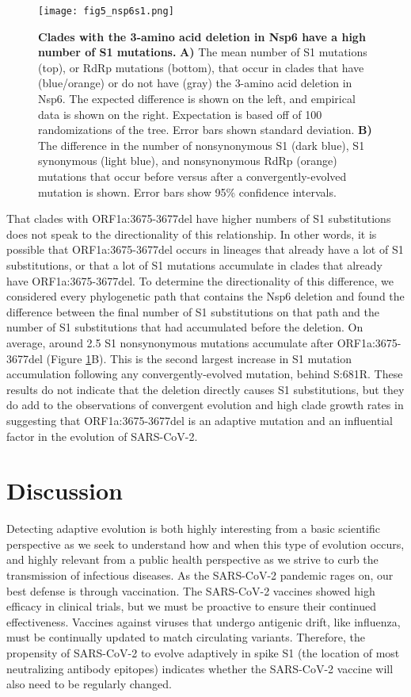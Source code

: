 \documentclass[11pt,oneside,letterpaper]{article}
\begin{document}
\begin{figure}[h!]
	\centerline{\texttt{[image: fig5\_nsp6s1.png]}}
	\caption{\textbf{Clades with the 3-amino acid deletion in Nsp6 have a high number of S1 mutations.}
	\textbf{A)} The mean number of S1 mutations (top), or RdRp mutations (bottom), that occur in clades that have (blue/orange) or do not have (gray) the 3-amino acid deletion in Nsp6.
	The expected difference is shown on the left, and empirical data is shown on the right.
	Expectation is based off of 100 randomizations of the tree. Error bars shown standard deviation.
	\textbf{B)} The difference in the number of nonsynonymous S1 (dark blue), S1 synonymous (light blue), and nonsynonymous RdRp (orange) mutations that occur before versus after a convergently-evolved mutation is shown.
	Error bars show 95\% confidence intervals.
	}
	\label{fig:nsp6s1}
\end{figure}

That clades with ORF1a:3675-3677del have higher numbers of S1 substitutions does not speak to the directionality of this relationship.
In other words, it is possible that ORF1a:3675-3677del occurs in lineages that already have a lot of S1 substitutions, or that a lot of S1 mutations accumulate in clades that already have ORF1a:3675-3677del.
To determine the directionality of this difference, we considered every phylogenetic path that contains the Nsp6 deletion and found the difference between the final number of S1 substitutions on that path and the number of S1 substitutions that had accumulated before the deletion.
On average, around 2.5 S1 nonsynonymous mutations accumulate after ORF1a:3675-3677del (Figure \ref{fig:nsp6s1}B).
This is the second largest increase in S1 mutation accumulation following any convergently-evolved mutation, behind S:681R.
These results do not indicate that the deletion directly causes S1 substitutions, but they do add to the observations of convergent evolution and high clade growth rates in suggesting that ORF1a:3675-3677del is an adaptive mutation and an influential factor in the evolution of SARS-CoV-2.



\section*{Discussion}
Detecting adaptive evolution is both highly interesting from a basic scientific perspective as we seek to understand how and when this type of evolution occurs, and highly relevant from a public health perspective as we strive to curb the transmission of infectious diseases.
As the SARS-CoV-2 pandemic rages on, our best defense is through vaccination.
The SARS-CoV-2 vaccines showed high efficacy in clinical trials, but we must be proactive to ensure their continued effectiveness.
Vaccines against viruses that undergo antigenic drift, like influenza, must be continually updated to match circulating variants. 
Therefore, the propensity of SARS-CoV-2 to evolve adaptively in spike S1 (the location of most neutralizing antibody epitopes) indicates whether the SARS-CoV-2 vaccine will also need to be regularly changed.
\end{document}
